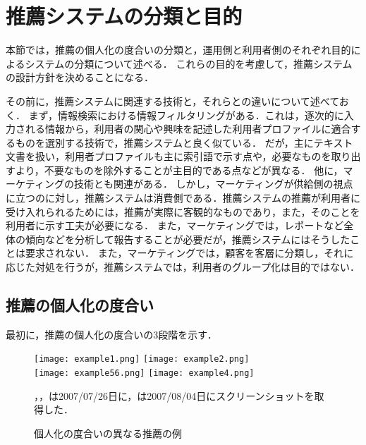 \chapter{推薦システムの分類と目的}
\label{chap:category}

本節では，推薦の個人化の度合いの分類と，運用側と利用者側のそれぞれ目的によるシステムの分類について述べる．
これらの目的を考慮して，推薦システムの設計方針を決めることになる．

その前に，推薦システムに関連する技術と，それらとの違いについて述べておく．
まず，情報検索における情報フィルタリングがある．これは，逐次的に入力される情報から，利用者の関心や興味を記述した利用者プロファイルに適合するものを選別する技術\cite{j:0021}で，推薦システムと良く似ている．
だが，主にテキスト文書を扱い，利用者プロファイルも主に索引語で示す点や，必要なものを取り出すより，不要なものを除外することが主目的である点などが異なる．
他に，マーケティングの技術とも関連がある．
しかし，マーケティングが供給側の視点に立つのに対し，推薦システムは消費側である．推薦システムの推薦が利用者に受け入れられるためには，推薦が実際に客観的なものであり，また，そのことを利用者に示す工夫が必要になる．
また，マーケティングでは，レポートなど全体の傾向などを分析して報告することが必要だが，推薦システムにはそうしたことは要求されない．
また，マーケティングでは，顧客を客層に分類し，それに応じた対処を行うが，推薦システムでは，利用者のグループ化は目的ではない．

\section{推薦の個人化の度合い}
\label{sec:plevel}

最初に，推薦の個人化の度合いの3段階\cite{dmkd:01:01}を示す．

\begin{figure}
\centering
{}%
{\texttt{[image: example1.png]}}%
\hspace{0.08\linewidth}%
%
{\texttt{[image: example2.png]}}\\\medskip
{}%
{\texttt{[image: example56.png]}}
\hspace{0.08\linewidth}%
%
{\texttt{[image: example4.png]}}\\
\caption{個人化の度合いの異なる推薦の例}
\label{fig:plevel}
{\footnotesize{}，，は2007/07/26日に，は2007/08/04日にスクリーンショットを取得した．}
\end{figure}

